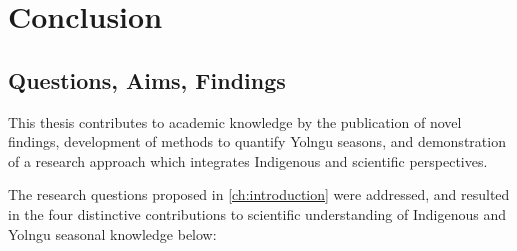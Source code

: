 \chapter{Conclusion}
\label{ch:conclusion}


\section{Questions, Aims, Findings}

This thesis contributes to academic knowledge by the publication of novel
findings, development of methods to quantify Yolngu seasons, and demonstration
of a research approach which integrates Indigenous and scientific perspectives.

The research questions proposed in \cref{ch:introduction} were addressed, and
resulted in the four distinctive contributions to scientific understanding
of Indigenous and Yolngu seasonal knowledge below:

